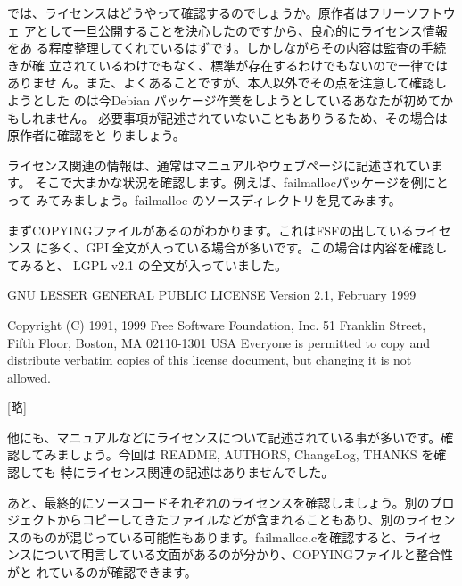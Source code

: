 \documentclass[mingoth,a4paper]{jsarticle}
\begin{document}
では、ライセンスはどうやって確認するのでしょうか。原作者はフリーソフトウェ
アとして一旦公開することを決心したのですから、良心的にライセンス情報をあ
る程度整理してくれているはずです。しかしながらその内容は監査の手続きが確
立されているわけでもなく、標準が存在するわけでもないので一律ではありませ
ん。また、よくあることですが、本人以外でその点を注意して確認しようとした
のは今Debian パッケージ作業をしようとしているあなたが初めてかもしれません。
必要事項が記述されていないこともありうるため、その場合は原作者に確認をと
りましょう。

ライセンス関連の情報は、通常はマニュアルやウェブページに記述されています。
そこで大まかな状況を確認します。例えば、failmallocパッケージを例にとって
みてみましょう。failmalloc のソースディレクトリを見てみます。


まずCOPYINGファイルがあるのがわかります。これはFSFの出しているライセンス
に多く、GPL全文が入っている場合が多いです。この場合は内容を確認してみると、
LGPL v2.1 の全文が入っていました。

\begin{commandline}
                  GNU LESSER GENERAL PUBLIC LICENSE
                       Version 2.1, February 1999

 Copyright (C) 1991, 1999 Free Software Foundation, Inc.
 51 Franklin Street, Fifth Floor, Boston, MA  02110-1301  USA
 Everyone is permitted to copy and distribute verbatim copies
 of this license document, but changing it is not allowed.

[略]
\end{commandline}

他にも、マニュアルなどにライセンスについて記述されている事が多いです。確
認してみましょう。今回は README, AUTHORS, ChangeLog, THANKS を確認しても
特にライセンス関連の記述はありませんでした。

あと、最終的にソースコードそれぞれのライセンスを確認しましょう。別のプロ
ジェクトからコピーしてきたファイルなどが含まれることもあり、別のライセン
スのものが混じっている可能性もあります。failmalloc.cを確認すると、ライセ
ンスについて明言している文面があるのが分かり、COPYINGファイルと整合性がと
れているのが確認できます。
\end{document}
